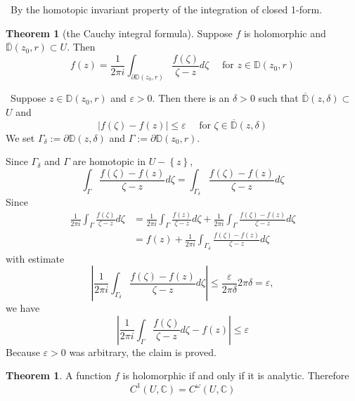 \documentclass[12pt,a4paper]{book}
\newenvironment{prooff}{{\noindent\it\textcolor{cyan!40!black}{Proof}:}\,}{\par}
\newcommand{\bbrace}[1]{\left\{ #1 \right\} }
\theoremstyle{definition}
\newtheorem{theo}[defn]{Theorem}
\begin{document}
\begin{prooff}
    By the homotopic invariant property of the integration of 
    closed 1-form.
\end{prooff}
\begin{theo}[the Cauchy integral formula]
    Suppose $f$ is holomorphic and $\overline{\mathbb{D}}\left(z_0, r\right) \subset U$. Then
$$
f(z)=\frac{1}{2 \pi i} \int_{\partial \mathbb{D}\left(z_0, r\right)} \frac{f(\zeta)}{\zeta-z} d \zeta \quad \text { for } z \in \mathbb{D}\left(z_0, r\right)
$$
\end{theo}
\begin{prooff}
    Suppose $z \in \mathbb{D}\left(z_0, r\right)$ and $\varepsilon>0$. Then there is an $\delta>0$ such that $\overline{\mathbb{D}}(z, \delta) \subset$ $U$ and
$$
|f(\zeta)-f(z)| \leq \varepsilon \quad \text { for } \zeta \in \overline{\mathbb{D}}(z, \delta)
$$
We set $\Gamma_\delta:=\partial \mathbb{D}(z, \delta)$ and $\Gamma:=\partial \mathbb{D}\left(z_0, r\right)$. 

Since $\Gamma_\delta$ and $\Gamma$ are homotopic in $U-\bbrace{z}$,
$$
\int_{\Gamma} \frac{f(\zeta)-f(z)}{\zeta-z} d \zeta=\int_{\Gamma_\delta} \frac{f(\zeta)-f(z)}{\zeta-z} d \zeta
$$
Since 
$$
\begin{aligned}
\frac{1}{2 \pi i} \int_{\Gamma} \frac{f(\zeta)}{\zeta-z} d \zeta & =\frac{1}{2 \pi i} \int_{\Gamma} \frac{f(z)}{\zeta-z} d \zeta+\frac{1}{2 \pi i} \int_{\Gamma} \frac{f(\zeta)-f(z)}{\zeta-z} d \zeta \\
& =f(z)+\frac{1}{2 \pi i} \int_{\Gamma_\delta} \frac{f(\zeta)-f(z)}{\zeta-z} d \zeta
\end{aligned}
$$
with estimate
$$
\left|\frac{1}{2 \pi i} \int_{\Gamma_\delta} \frac{f(\zeta)-f(z)}{\zeta-z} d \zeta\right| \leq \frac{\varepsilon}{2 \pi \delta} 2 \pi \delta=\varepsilon,
$$
we have 
$$
\left|\frac{1}{2 \pi i} \int_{\Gamma} \frac{f(\zeta)}{\zeta-z} d \zeta-f(z)\right| \leq \varepsilon
$$
Because $\varepsilon>0$ was arbitrary, the claim is proved.
\end{prooff}
\begin{theo}
    A function $f$ is holomorphic if and only if it is analytic. Therefore
    $$
    C^1(U, \mathbb{C})=C^\omega(U, \mathbb{C})
    $$
\end{theo}
\end{document}
